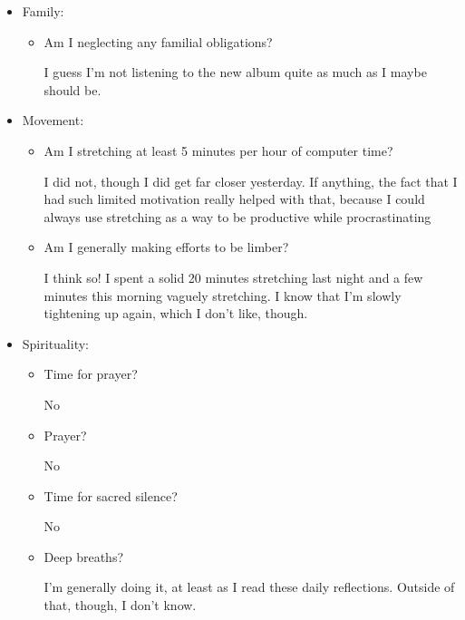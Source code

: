\documentclass[12pt]{article}
\renewcommand{\,}{\textsuperscript{,}}
\begin{document}
\begin{enumerate}
\begin{itemize}
\begin{itemize}
\end{itemize}

\item Family:

\begin{itemize}

\item Am I neglecting any familial obligations?

I guess I'm not listening to the new album quite as much as I maybe should be.

\end{itemize}

\item Movement:

\begin{itemize}

\item Am I stretching at least 5 minutes per hour of computer time?

I did not, though I did get far closer yesterday. If anything, the fact that I had such limited motivation really helped with that, because I could always use stretching as a way to be productive while procrastinating

\item Am I generally making efforts to be limber?

I think so! I spent a solid 20 minutes stretching last night and a few minutes this morning vaguely stretching. I know that I'm slowly tightening up again, which I don't like, though.

\end{itemize}

\item Spirituality:

\begin{itemize}

\item Time for prayer?

No

\item Prayer?

No

\item Time for sacred silence?

No

\item Deep breaths?

I'm generally doing it, at least as I read these daily reflections. Outside of that, though, I don't know.

\end{itemize}


\end{itemize}
\end{enumerate}
\end{document}
